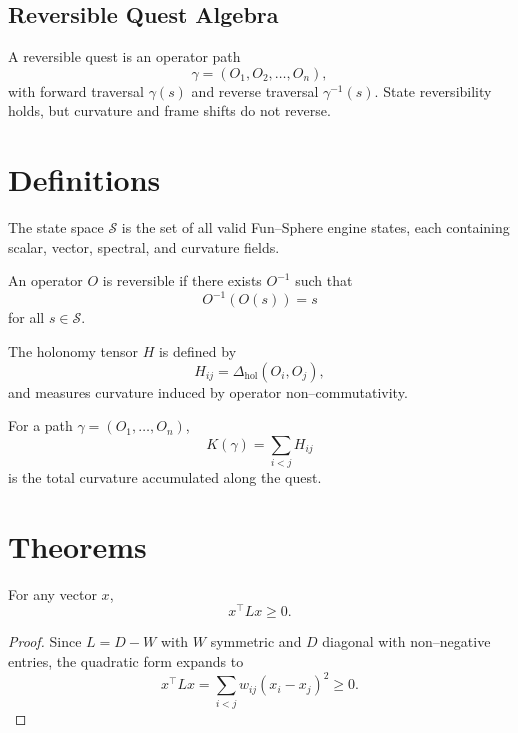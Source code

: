 \subsection{Reversible Quest Algebra}
A reversible quest is an operator path
\[
\gamma = (O_1, O_2, \ldots, O_n),
\]
with forward traversal $\gamma(s)$ and reverse traversal
$\gamma^{-1}(s)$. State reversibility holds, but curvature and frame
shifts do not reverse.

\section{Definitions}

\begin{definition}
The state space $\mathcal{S}$ is the set of all valid Fun–Sphere engine
states, each containing scalar, vector, spectral, and curvature fields.
\end{definition}

\begin{definition}
An operator $O$ is reversible if there exists $O^{-1}$ such that
\[
O^{-1}(O(s)) = s
\]
for all $s \in \mathcal{S}$.
\end{definition}

\begin{definition}
The holonomy tensor $H$ is defined by
\[
H_{ij} = \Delta_{\mathrm{hol}}(O_i, O_j),
\]
and measures curvature induced by operator non–commutativity.
\end{definition}

\begin{definition}
For a path $\gamma = (O_1, \ldots, O_n)$,
\[
K(\gamma) = \sum_{i < j} H_{ij}
\]
is the total curvature accumulated along the quest.
\end{definition}

\section{Theorems}

\begin{theorem}
For any vector $x$,
\[
x^\top L x \ge 0.
\]
\end{theorem}

\begin{proof}
Since $L = D - W$ with $W$ symmetric and $D$ diagonal with non–negative
entries, the quadratic form expands to
\[
x^\top L x = \sum_{i < j} w_{ij} (x_i - x_j)^2 \ge 0.
\]
\end{proof}

